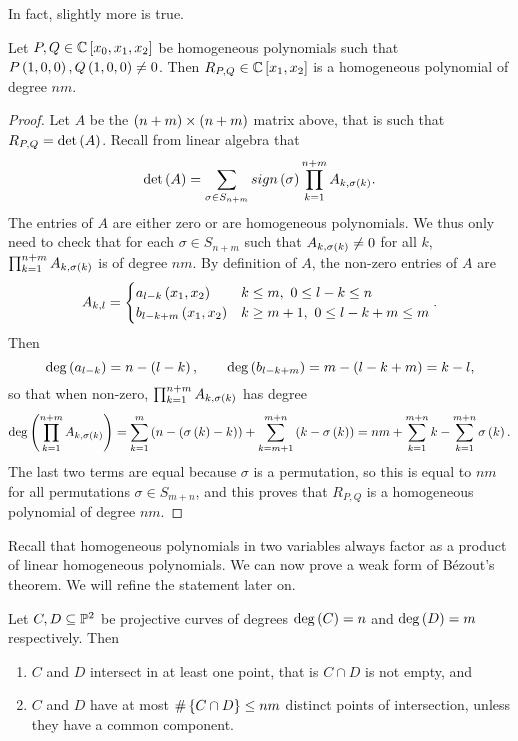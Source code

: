 In fact, slightly more is true.

\begin{theorem}
\label{thm:9.7}
Let $ P, Q \in \C\sb{x_0, x_1, x_2} $ be homogeneous polynomials such that $ P\rb{1, 0, 0}, Q\rb{1, 0, 0} \ne 0 $. Then $ R_{P, Q} \in \C\sb{x_1, x_2} $ is a homogeneous polynomial of degree $ nm $.
\end{theorem}

\begin{proof}
Let $ A $ be the $ \rb{n + m} \times \rb{n + m} $ matrix above, that is such that $ R_{P, Q} = \det\rb{A} $. Recall from linear algebra that
$$ \det\rb{A} = \sum_{\sigma \in S_{n + m}} sign\rb{\sigma}\prod_{k = 1}^{n + m}A_{k, \sigma\rb{k}}. $$
The entries of $ A $ are either zero or are homogeneous polynomials. We thus only need to check that for each $ \sigma \in S_{n + m} $ such that $ A_{k, \sigma\rb{k}} \ne 0 $ for all $ k $, $ \prod_{k = 1}^{n + m} A_{k, \sigma\rb{k}} $ is of degree $ nm $. By definition of $ A $, the non-zero entries of $ A $ are
$$ A_{k, l} =
\begin{cases}
a_{l - k}\rb{x_1, x_2} & k \le m, \ 0 \le l - k \le n \\
b_{l - k + m}\rb{x_1, x_2} & k \ge m + 1, \ 0 \le l - k + m \le m
\end{cases}.
$$
Then
$$ \deg\rb{a_{l - k}} = n - \rb{l - k}, \qquad \deg\rb{b_{l - k + m}} = m - \rb{l - k + m} = k - l, $$
so that when non-zero, $ \prod_{k = 1}^{n + m} A_{k, \sigma\rb{k}} $ has degree
$$ \deg\rb{\prod_{k = 1}^{n + m} A_{k, \sigma\rb{k}}} = \sum_{k = 1}^m \rb{n - \rb{\sigma\rb{k} - k}} + \sum_{k = m + 1}^{m + n} \rb{k - \sigma\rb{k}} = nm + \sum_{k = 1}^{m + n} k - \sum_{k = 1}^{m + n} \sigma\rb{k}. $$
The last two terms are equal because $ \sigma $ is a permutation, so this is equal to $ nm $ for all permutations $ \sigma \in S_{m + n} $, and this proves that $ R_{P, Q} $ is a homogeneous polynomial of degree $ nm $.
\end{proof}

Recall that homogeneous polynomials in two variables always factor as a product of linear homogeneous polynomials. We can now prove a weak form of B\'ezout's theorem. We will refine the statement later on.

\begin{theorem}
\label{thm:9.8}
Let $ C, D \subseteq \P^2 $ be projective curves of degrees $ \deg\rb{C} = n $ and $ \deg\rb{D} = m $ respectively. Then
\begin{enumerate}
\item $ C $ and $ D $ intersect in at least one point, that is $ C \cap D $ is not empty, and
\item $ C $ and $ D $ have at most $ \#\cb{C \cap D} \le nm $ distinct points of intersection, unless they have a common component.
\end{enumerate}
\end{theorem}

